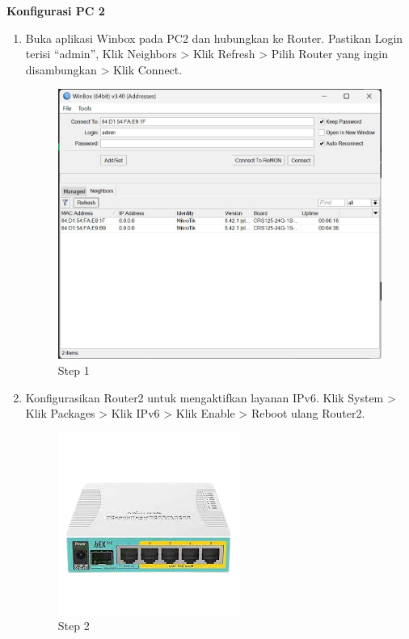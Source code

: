 \begin{enumerate}
\end{enumerate}

\begin{center} 
	\textbf{Konfigurasi PC 2}
\end{center}

\begin{enumerate}
	\item Buka aplikasi Winbox pada PC2 dan hubungkan ke Router. Pastikan Login terisi “admin”, Klik
	Neighbors > Klik Refresh > Pilih Router yang ingin disambungkan > Klik Connect.
	
	\begin{figure}[H]
		\centering
		\includegraphics[width=0.7\linewidth]{P5/img/step1.jpg}
		\caption{Step 1}
		\label{fig:gambar1}
	\end{figure}

	\item Konfigurasikan Router2 untuk mengaktifkan layanan IPv6. Klik System > Klik Packages > Klik
	IPv6 > Klik Enable > Reboot ulang Router2.	
	
	\begin{figure}[H]
		\centering
		\includegraphics[width=0.7\linewidth]{P1/img/contoh.png}
		\caption{Step 2}
		\label{fig:gambar1}
	\end{figure}


\end{enumerate}
